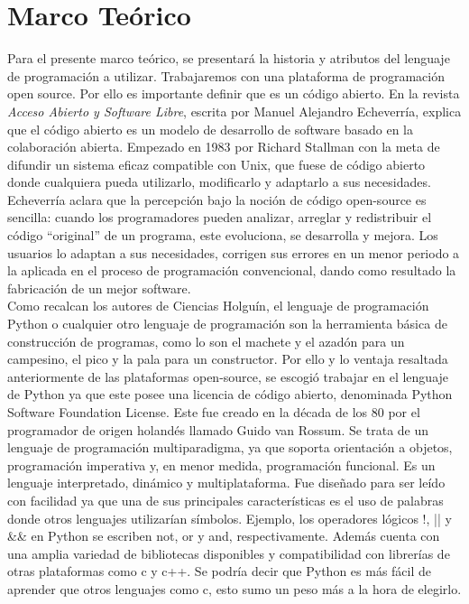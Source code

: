 \documentclass[12pt,letterpaper]{article}
\begin{document}
\section{Marco Teórico} 
Para el presente marco teórico, se presentará la historia y atributos del lenguaje de programación a utilizar. Trabajaremos con una plataforma de programación open source. Por ello es importante definir que es un código abierto. En la revista \textit{Acceso Abierto y Software Libre}, escrita por Manuel Alejandro Echeverría, explica que el código abierto es un modelo de desarrollo de software basado en la colaboración abierta. Empezado en 1983 por Richard Stallman con la meta de difundir un sistema eficaz compatible con Unix, que fuese de código abierto donde cualquiera pueda utilizarlo, modificarlo y adaptarlo a sus necesidades. Echeverría aclara que la percepción bajo la noción de código open-source es sencilla: cuando los programadores pueden analizar, arreglar y redistribuir el código ``original'' de un programa, este evoluciona, se desarrolla y mejora. Los usuarios lo adaptan a sus necesidades, corrigen sus errores en un menor periodo a la aplicada en el proceso de programación convencional, dando como resultado la fabricación de un mejor software.\vspace{5mm}\\
\indent Como recalcan los autores de Ciencias Holguín, el lenguaje de programación Python o cualquier otro lenguaje de programación son la herramienta básica de construcción de programas, como lo son el machete y el azadón para un campesino, el pico y la pala para un constructor. Por ello y lo ventaja resaltada anteriormente de las plataformas open-source, se escogió trabajar en el lenguaje de Python ya que este posee una licencia de código abierto, denominada Python Software Foundation License. Este fue creado en la década de los 80 por el programador de origen holandés llamado Guido van Rossum. Se trata de un lenguaje de programación multiparadigma, ya que soporta orientación a objetos, programación imperativa y, en menor medida, programación funcional. Es un lenguaje interpretado, dinámico y multiplataforma. Fue diseñado para ser leído con facilidad ya que una de sus principales características es el uso de palabras donde otros lenguajes utilizarían símbolos. Ejemplo, los operadores lógicos !, || y \&\& en Python se escriben not, or y and, respectivamente. Además cuenta con una amplia variedad de bibliotecas disponibles y compatibilidad con librerías de otras plataformas como c y c++. Se podría decir que Python es más fácil de aprender que otros lenguajes como c, esto sumo un peso más a la hora de elegirlo.\vspace{5mm}\\
\end{document}
